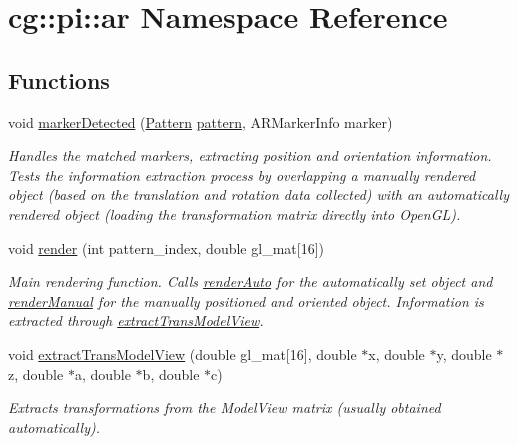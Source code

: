 \hypertarget{namespacecg_1_1pi_1_1ar}{\section{cg\-:\-:pi\-:\-:ar \-Namespace \-Reference}
\label{namespacecg_1_1pi_1_1ar}
}
\subsection*{\-Functions}
\begin{DoxyCompactItemize}
\item 
void \hyperlink{namespacecg_1_1pi_1_1ar_afefc10089c39a2f9ff586acfff13020a}{marker\-Detected} (\hyperlink{classcg_1_1pi_1_1_pattern}{\-Pattern} \hyperlink{namespacecg_1_1pi_1_1ar_a73773bdd3e1457f2e80a246d51c9c10b}{pattern}, \-A\-R\-Marker\-Info marker)
\begin{DoxyCompactList}\small\item\em \-Handles the matched markers, extracting position and orientation information. \-Tests the information extraction process by overlapping a manually rendered object (based on the translation and rotation data collected) with an automatically rendered object (loading the transformation matrix directly into \-Open\-G\-L). \end{DoxyCompactList}\item 
void \hyperlink{namespacecg_1_1pi_1_1ar_ad75c3e3f77a179d1d503fb060b2913d1}{render} (int pattern\-\_\-index, double gl\-\_\-mat\mbox{[}16\mbox{]})
\begin{DoxyCompactList}\small\item\em \-Main rendering function. \-Calls \hyperlink{namespacecg_1_1pi_1_1ar_a2a7b1d68ad09bf0baa75dc4e3339fc47}{render\-Auto} for the automatically set object and \hyperlink{namespacecg_1_1pi_1_1ar_a601058fdb418bc8d7c95e64256cee4c3}{render\-Manual} for the manually positioned and oriented object. \-Information is extracted through \hyperlink{namespacecg_1_1pi_1_1ar_a5b0f476cf646a6b0d26490f594f64a33}{extract\-Trans\-Model\-View}. \end{DoxyCompactList}\item 
void \hyperlink{namespacecg_1_1pi_1_1ar_a5b0f476cf646a6b0d26490f594f64a33}{extract\-Trans\-Model\-View} (double gl\-\_\-mat\mbox{[}16\mbox{]}, double $\ast$x, double $\ast$y, double $\ast$z, double $\ast$a, double $\ast$b, double $\ast$c)
\begin{DoxyCompactList}\small\item\em \-Extracts transformations from the \-Model\-View matrix (usually obtained automatically). \end{DoxyCompactList}\item 

\end{DoxyCompactItemize}
